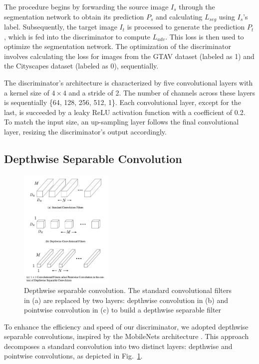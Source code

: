 \documentclass[conference]{IEEEtran}
\begin{document}
The procedure begins by forwarding the source image $I_s$ through the segmentation network to obtain its prediction $P_s$ and calculating $L_{seg}$ using $I_s$'s label. Subsequently, the target image $I_t$ is processed to generate the prediction $P_t$, which is fed into the discriminator to compute $L_{adv}$. This loss is then used to optimize the segmentation network. The optimization of the discriminator involves calculating the loss for images from the GTAV dataset (labeled as 1) and the Cityscapes dataset (labeled as 0), sequentially.

The discriminator's architecture is characterized by five convolutional layers with a kernel size of $4 \times 4$ and a stride of 2. The number of channels across these layers is sequentially \{64, 128, 256, 512, 1\}. Each convolutional layer, except for the last, is succeeded by a leaky ReLU activation function \cite{b9} with a coefficient of 0.2. To match the input size, an up-sampling layer follows the final convolutional layer, resizing the discriminator's output accordingly.

\subsection{Depthwise Separable Convolution}

\begin{figure}[tp]
\centerline{\includegraphics[width=0.4\textwidth]{figures/depthwise ocnv.pdf.png}}
\caption{Depthwise separable convolution. The standard convolutional filters in (a) are replaced by two layers: depthwise convolution in (b) and pointwise convolution in (c) to build a depthwise separable filter}
\label{fig:depthwise}
\end{figure}

To enhance the efficiency and speed of our discriminator, we adopted depthwise separable convolutions, inspired by the MobileNets architecture \cite{b6}. This approach decomposes a standard convolution into two distinct layers: depthwise and pointwise convolutions, as depicted in Fig.~\ref{fig:depthwise}.
\end{document}
